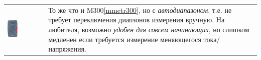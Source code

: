 \begin{tabular}{p{} p{}}
\noindent\includegraphics[width=0.3\textwidth]{tech/tools/mes/M320.jpg}
&
То же что и M300\ref{mmetr300}, но с \emph{автодиапазоном}, т.е. не требует
переключения диапзонов измерения вручную. На любителя, возможно \emph{удобен для
совсем начинающих}, но слишком медленен если требуется измерение меняющегося
тока/напряжения.
\\
\end{tabular}

\secup




\label{rlcmetr}

\secup



\secup
